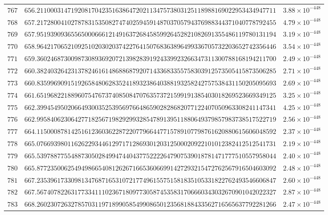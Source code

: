 \documentclass[12pt,reqno]{amsart}
\theoremstyle{remark}
\begin{document}
\begin{longtable}{clc}
$767$ & $656.2110003147192081704235163864720211347573803125118988169022953434947711$ & $3.88\times 10^{-448}$ \\
$768$ & $657.2172800410278783153508274740259459148703705794376988344371040778792455$ & $4.79\times 10^{-448}$ \\
$769$ & $657.9519390936556500066612149163726845859926452821082691355486119780131194$ & $3.19\times 10^{-448}$ \\
$770$ & $658.9642170652109251020302037422764150768363896499336705732203652742356446$ & $3.54\times 10^{-448}$ \\
$771$ & $659.3602468730098730893692072139828391924339923266347311300788168194211700$ & $2.49\times 10^{-448}$ \\
$772$ & $660.3824032642313782461614868868792071433683355758303912573505415873506285$ & $2.71\times 10^{-448}$ \\
$773$ & $660.8359969091519265848062835241893238640388193258242757538431150205095693$ & $2.69\times 10^{-448}$ \\
$774$ & $661.6519682218896075476737408508470763573721599191385403018269523669349125$ & $3.25\times 10^{-448}$ \\
$775$ & $662.3994549502066493003525395697664865902828682077122407050963308241147341$ & $4.25\times 10^{-448}$ \\
$776$ & $662.9958406230642771825671982929932854789139511880649379857983738517522719$ & $2.56\times 10^{-448}$ \\
$777$ & $664.1150008781425161236036228722077966447715789107798761620880615606048592$ & $2.37\times 10^{-448}$ \\
$778$ & $665.0766939801162622934461297171286930120312500020922101012382412512541731$ & $2.19\times 10^{-448}$ \\
$779$ & $665.5397887755488730502849947440437752222647907539018781471777510557958044$ & $2.40\times 10^{-448}$ \\
$780$ & $665.8772350062549498665408126267166536066991427293215472762567916504603092$ & $2.48\times 10^{-448}$ \\
$781$ & $667.2353961733098134768716531072177496155751581835105331822762493546606847$ & $2.60\times 10^{-448}$ \\
$782$ & $667.5674078226317733411102367180977305874535831706660343032670901042022327$ & $2.87\times 10^{-448}$ \\
$783$ & $668.2602307263278570311971899058549908650123568188433562716565637792281266$ & $2.47\times 10^{-448}$ \\

\end{longtable}
\end{document}
